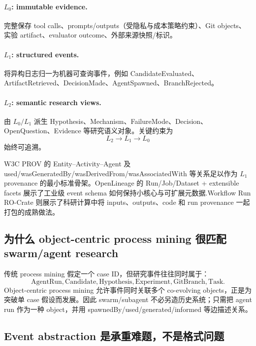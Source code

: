\documentclass[11pt,a4paper]{ctexart}
\begin{document}
\paragraph{$L_0$: immutable evidence.}
完整保存 tool calls、prompts/outputs（受隐私与成本策略约束）、Git objects、实验 artifact、evaluator outcome、外部来源快照/标识。

\paragraph{$L_1$: structured events.}
将异构日志归一为机器可查询事件，例如 CandidateEvaluated、ArtifactRetrieved、DecisionMade、AgentSpawned、BranchRejected。

\paragraph{$L_2$: semantic research views.}
由 $L_0/L_1$ 派生 Hypothesis、Mechanism、FailureMode、Decision、OpenQuestion、Evidence 等研究语义对象。关键约束为
\begin{equation}
 L_2\to L_1\to L_0
\end{equation}
始终可追溯。

W3C PROV 的 Entity--Activity--Agent 及 used/wasGeneratedBy/wasDerivedFrom/wasAssociatedWith 等关系足以作为 $L_1$ provenance 的最小标准骨架\parencite{w3cprov2013}。OpenLineage 的 Run/Job/Dataset + extensible facets 展示了工业级 event schema 如何保持小核心与可扩展元数据\parencite{openlineage}.Workflow Run RO-Crate 则展示了科研计算中将 inputs、outputs、code 和 run provenance 一起打包的成熟做法\parencite{leo2024wfrun}。

\subsection{为什么 object-centric process mining 很匹配 swarm/agent research}

传统 process mining 假定一个 case ID，但研究事件往往同时属于：
\begin{equation}
 \text{AgentRun},\text{Candidate},\text{Hypothesis},\text{Experiment},\text{GitBranch},\text{Task}.
\end{equation}
Object-centric process mining 允许事件同时关联多个 co-evolving objects，正是为突破单 case 假设而发展\parencite{berti2023ocpm,vanderAalst2026ocpm}。因此 swarm/subagent 不必另造历史系统；只需把 agent run 作为一种 object，并用 spawnedBy/used/generated/informed 等边描述关系。

\subsection{Event abstraction 是承重难题，不是格式问题}
\end{document}
